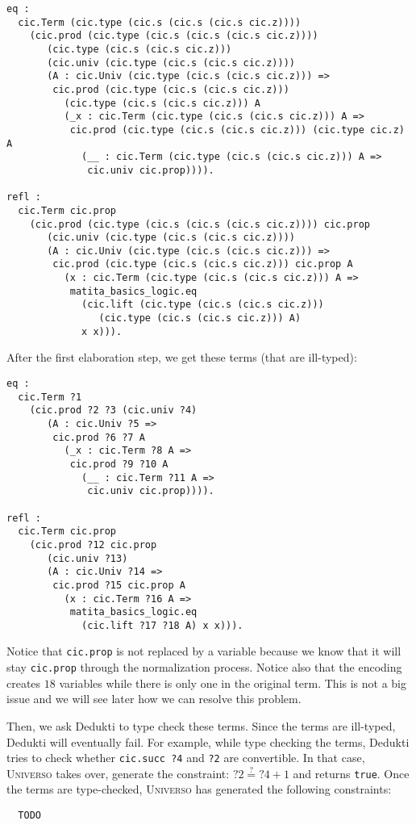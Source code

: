 \documentclass{article}
\newcommand{\universo}{\textsc{Universo}}
\begin{document}
\begin{verbatim}
eq :
  cic.Term (cic.type (cic.s (cic.s (cic.s cic.z))))
    (cic.prod (cic.type (cic.s (cic.s (cic.s cic.z))))
       (cic.type (cic.s (cic.s cic.z)))
       (cic.univ (cic.type (cic.s (cic.s cic.z))))
       (A : cic.Univ (cic.type (cic.s (cic.s cic.z))) =>
        cic.prod (cic.type (cic.s (cic.s cic.z)))
          (cic.type (cic.s (cic.s cic.z))) A
          (_x : cic.Term (cic.type (cic.s (cic.s cic.z))) A =>
           cic.prod (cic.type (cic.s (cic.s cic.z))) (cic.type cic.z) A
             (__ : cic.Term (cic.type (cic.s (cic.s cic.z))) A =>
              cic.univ cic.prop)))).

refl :
  cic.Term cic.prop
    (cic.prod (cic.type (cic.s (cic.s (cic.s cic.z)))) cic.prop
       (cic.univ (cic.type (cic.s (cic.s cic.z))))
       (A : cic.Univ (cic.type (cic.s (cic.s cic.z))) =>
        cic.prod (cic.type (cic.s (cic.s cic.z))) cic.prop A
          (x : cic.Term (cic.type (cic.s (cic.s cic.z))) A =>
           matita_basics_logic.eq
             (cic.lift (cic.type (cic.s (cic.s cic.z)))
                (cic.type (cic.s (cic.s cic.z))) A)
             x x))).
\end{verbatim}

After the first elaboration step, we get these terms (that are ill-typed):
\begin{verbatim}
eq :
  cic.Term ?1
    (cic.prod ?2 ?3 (cic.univ ?4)
       (A : cic.Univ ?5 =>
        cic.prod ?6 ?7 A
          (_x : cic.Term ?8 A =>
           cic.prod ?9 ?10 A
             (__ : cic.Term ?11 A =>
              cic.univ cic.prop)))).

refl :
  cic.Term cic.prop
    (cic.prod ?12 cic.prop
       (cic.univ ?13)
       (A : cic.Univ ?14 =>
        cic.prod ?15 cic.prop A
          (x : cic.Term ?16 A =>
           matita_basics_logic.eq
             (cic.lift ?17 ?18 A) x x))).
\end{verbatim}

Notice that \texttt{cic.prop} is not replaced by a variable because we know that it will stay \texttt{cic.prop} through the normalization process. Notice also that the encoding creates \(18\) variables while there is only one in the original term. This is not a big issue and we will see later how we can resolve this problem.

Then, we ask Dedukti to type check these terms. Since the terms are ill-typed, Dedukti will eventually fail. For example, while type checking the terms, Dedukti tries to check whether \texttt{cic.succ ?4} and \texttt{?2} are convertible. In that case, \universo{} takes over, generate the constraint: \(?2 \stackrel{?}{=} ?4 + 1\) and returns \texttt{true}. Once the terms are type-checked, \universo{} has generated the following constraints:
\begin{verbatim}
  TODO
\end{verbatim}
\end{document}
